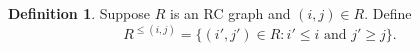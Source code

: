 \documentclass{amsart}
\newtheorem{lemma}{Lemma}[subsection]
\theoremstyle{definition}
\newtheorem{definition}[lemma]{Definition}
\theoremstyle{remark}
\numberwithin{equation}{subsection}
\newcommand{\wof}[1]{w_{#1}}
\newcommand{\rtt}{\mathtt{rt}}
\newcommand{\hr}{\mathtt{ht}}
\newcommand{\code}{\mathfrak{c}}
\newcommand{\maxd}{\mathfrak{m}}
\begin{document}

\begin{definition}
Suppose $R$ is an RC graph and $(i,j)\in R$. Define
$$R^{\leq (i,j)} = \{(i',j')\in R :i'\leq i\text{ and }j'\geq j\}.$$
\end{definition}

  
  
 
\end{document}

